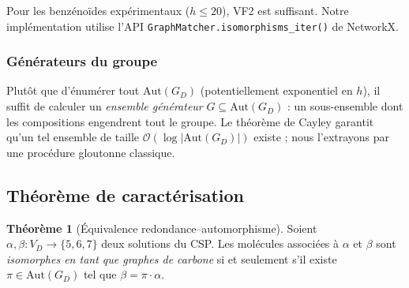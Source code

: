 \documentclass[12pt,a4paper]{article}
\theoremstyle{definition}
\newtheorem{theoreme}[definition]{Th\'eor\`eme}
\theoremstyle{remark}
\newcommand{\GD}{G_{\!D}}
\newcommand{\VD}{V_{\!D}}
\newcommand{\Aut}{\mathrm{Aut}}
\newcommand{\bigO}{\mathcal{O}}
\begin{document}
Pour les benz\'eno\"ides exp\'erimentaux ($h \leq 20$), VF2 est
suffisant. Notre impl\'ementation utilise l'API
\texttt{GraphMatcher.isomorphisms\_iter()} de NetworkX.

\subsubsection{G\'en\'erateurs du groupe}

Plut\^ot que d'\'enum\'erer tout $\Aut(\GD)$ (potentiellement
exponentiel en $h$), il suffit de calculer un \emph{ensemble
g\'en\'erateur} $G \subseteq \Aut(\GD)$ : un sous-ensemble dont les
compositions engendrent tout le groupe. Le th\'eor\`eme de Cayley
garantit qu'un tel ensemble de taille $\bigO(\log |\Aut(\GD)|)$
existe ; nous l'extrayons par une proc\'edure gloutonne classique.

\subsection{Th\'eor\`eme de caract\'erisation}

\begin{theoreme}[\'Equivalence redondance--automorphisme]
\label{thm:sym}
Soient $\alpha, \beta : \VD \to \{5, 6, 7\}$ deux solutions du CSP. Les
mol\'ecules associ\'ees \`a $\alpha$ et $\beta$ sont \emph{isomorphes en
tant que graphes de carbone} si et seulement s'il existe $\pi \in
\Aut(\GD)$ tel que $\beta = \pi \cdot \alpha$.
\end{theoreme}
\end{document}
